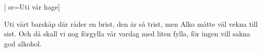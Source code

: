 [ 						
	sr={Uti vår hage}]		
	
\beginverse*						
Uti vårt barskåp där råder en brist,
den är så trist,
men Alko måtte väl vekna till sist. 
Och då skall vi nog förgylla
vår vardag med liten fylla, 
för ingen vill sakna
god alkohol.
\endverse										
\endsong		
